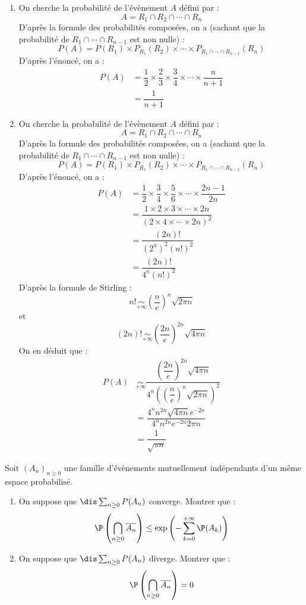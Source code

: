 \documentclass[a4paper,10pt]{report}
\begin{document}
\begin{enumerate}
\item On cherche la probabilité de l'évènement $A$ défini par :
$$ A = R_1 \cap R_2 \cap \cdots \cap R_n$$
D'après la formule des probabilités composées, on a (sachant que la probabilité de $R_1 \cap \cdots \cap R_{n-1}$ est non nulle) :
$$ P(A) = P(R_1) \times P_{R_1}(R_2) \times \cdots \times P_{R_1 \cap \cdots \cap R_{n-1}}(R_n)$$
D'après l'énoncé, on a :
\begin{align*}
P(A) & = \dfrac{1}{2} \times \dfrac{2}{3} \times \dfrac{3}{4} \times \cdots \times \dfrac{n}{n+1} \\
& = \dfrac{1}{n+1}
\end{align*}
\item On cherche la probabilité de l'évènement $A$ défini par :
$$ A = R_1 \cap R_2 \cap \cdots \cap R_n$$
D'après la formule des probabilités composées, on a (sachant que la probabilité de $R_1 \cap \cdots \cap R_{n-1}$ est non nulle) :
$$ P(A) = P(R_1) \times P_{R_1}(R_2) \times \cdots \times P_{R_1 \cap \cdots \cap R_{n-1}}(R_n)$$
D'après l'énoncé, on a :
\begin{align*}
P(A) & = \dfrac{1}{2} \times \dfrac{3}{4} \times \dfrac{5}{6} \times \cdots \times \dfrac{2n-1}{2n} \\
& = \dfrac{1 \times 2 \times 3 \times \cdots \times 2n}{(2 \times 4 \times \cdots \times 2n)^2} \\
& = \dfrac{(2n)!}{(2^n)^2 (n!)^2} \\
&= \dfrac{(2n)!}{4^n (n!)^2}
\end{align*}
D'après la formule de Stirling :
$$ n! \underset{+ \infty}{\sim} \left(\dfrac{n}{e} \right)^n \sqrt{2 \pi n}$$
et 
$$ (2n)! \underset{+ \infty}{\sim} \left(\dfrac{2n}{e} \right)^{2n} \sqrt{4 \pi n}$$
On en déduit que :
\begin{align*}
P(A) & \underset{+ \infty}{\sim} \dfrac{\left(\dfrac{2n}{e} \right)^{2n} \sqrt{4 \pi n}}{4^n \left(\left(\dfrac{n}{e} \right)^n \sqrt{2 \pi n}\right)^2} \\
& = \dfrac{4^n n^{2n} \sqrt{4 \pi n} e^{-2n}}{4^n n^{2n} e^{-2n}2\pi n} \\
& = \dfrac{1}{\sqrt{\pi n}}
\end{align*}
\end{enumerate}


\begin{Exercice}{} Soit $(A_n)_{n \geq 0}$ une famille d'évènements mutuellement indépendants d'un même espace probabilisé.
\begin{enumerate}
\item On suppose que $\dis \sum_{n \geq 0} P(A_n)$ converge. Montrer que :
$$ \P \left( \bigcap_{n \geq 0} \overline{A_n} \right) \leq \exp \left(- \sum_{k=0}^{+ \infty} \P(A_k) \right)$$
\item On suppose que $\dis \sum_{n \geq 0} P(A_n)$ diverge. Montrer que :
$$ \P \left( \bigcap_{n \geq 0} \overline{A_n} \right) = 0$$
\end{enumerate}
\end{Exercice}
\end{document}
